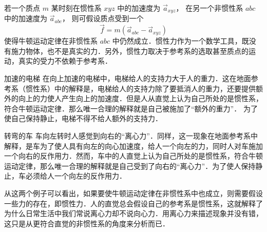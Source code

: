 

若一个质点 $m$ 某时刻在惯性系 $xyz$ 中的加速度为 $\vec a_{xyz}$， 在另一个非惯性系 $abc$ 中的加速度为 $\vec a_{abc}$， 则可假设质点受到一个
\begin{equation}
\vec f = m( \vec a_{abc} - \vec a_{xyz} )
\end{equation}
使得牛顿运动定律在非惯性系 $abc$ 中仍然成立．惯性力作为一个数学工具，既没有施力物体，也不是真实的力．另外，惯性力取决于参考系的选取甚至质点的运动，真实的受力不依赖于参考系．

\begin{exam}{加速的电梯}\label{Iner_ex1}
在向上加速的电梯中，电梯给人的支持力大于人的重力．这在地面参考系（惯性系）中的解释是，电梯给人的支持力除了要抵消人的重力，还要提供额外的向上的力使人产生向上的加速度．但是人从直觉上认为自己所处的是惯性系，符合牛顿运动定律．那么唯一合理的解释就是自己被施加了“额外的重力”． 为了使自己保持静止，电梯不得不给人额外的支持力．
\end{exam}

\begin{exam}{转弯的车}
车向左转时人感觉到向右的“离心力”．同样，这一现象在地面参考系中解释，是车为了使人具有向左的向心加速度，给人一个向左的力，同时人对车施加一个向右的反作用力．然而，车中的人直觉上认为自己所处的是惯性系，符合牛顿运动定律，那么唯一合理的解释就是自己受到了向右的“离心力”．为了使人保持静止，车必须给人一个向左的反作用力．
\end{exam}

从这两个例子可以看出，如果要使牛顿运动定律在非惯性系中也成立，则需要假设一些力的存在，即惯性力．人的直觉总会假设自己的参考系是惯性系，这就解释了为什么日常生活中我们常说离心力却不说向心力．用离心力来描述现象并没有错，这只是从更符合直觉的非惯性系的角度来分析而已．

